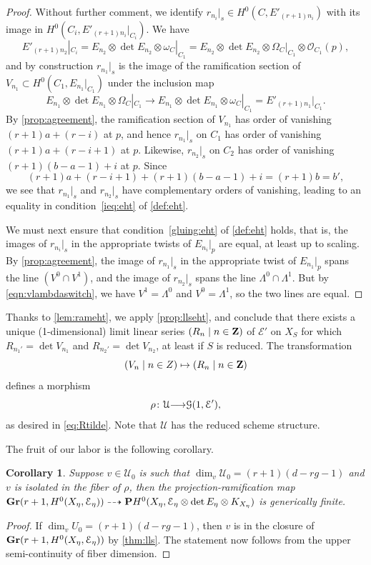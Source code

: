 \documentclass[11pt,reqno]{amsart}
\theoremstyle{plain}
\newtheorem{corollary}[theorem]{Corollary}
\theoremstyle{definition}
\theoremstyle{remark}
\numberwithin{equation}{section}
\renewcommand{\to}{{\longrightarrow}}
\numberwithin{equation}{section}
\renewcommand{\O}{\mathcal O}
\begin{document}
\begin{proof}
  Without further comment, we identify $r_{n_i}|_s \in H^0(C, E'_{(r+1)n_i})$ with its image in $H^0(C_i, E'_{(r+1)n_i}|_{C_i})$.
  We have
  \[E'_{(r+1)n_2}|_{C_i} = E_{n_2} \otimes \det E_{n_2} \otimes \omega_C|_{C_1} = E_{n_2} \otimes \det E_{n_2} \otimes \Omega_C|_{C_1} \otimes \O_{C_1}(p),\]
  and by construction $r_{n_1}|_s$ is the image of the ramification section of $V_{n_1} \subset H^0(C_1, E_{n_1}|_{C_1})$ under the inclusion map
  \[ E_{n_1} \otimes \det E_{n_1} \otimes \Omega_C|_{C_1} \to E_{n_1} \otimes \det E_{n_1} \otimes \omega_C|_{C_1} = E'_{(r+1)n_1}|_{C_1}.\]
  By \autoref{prop:agreement}, the ramification section of $V_{n_1}$ has order of vanishing $(r+1)a+(r-i)$ at $p$, and hence $r_{n_1}|_s$ on $C_1$ has order of vanishing $(r+1)a+(r-i+1)$ at $p$.
  Likewise, $r_{n_2}|_s$ on $C_2$ has order of vanishing $(r+1)(b-a-1)+i$ at $p$.
  Since
  \[ (r+1)a+(r-i+1) + (r+1)(b-a-1) + i = (r+1)b = b',\]
  we see that $r_{n_1}|_s$ and $r_{n_2}|_s$ have complementary orders of vanishing, leading to an equality in condition~\eqref{ieq:eht} of \autoref{def:eht}.

  We must next ensure that condition~\eqref{gluing:eht} of \autoref{def:eht} holds, that is, the images of $r_{n_i}|_s$ in the appropriate twists of $E_{n_i}|_p$ are equal, at least up to scaling.
  By \autoref{prop:agreement}, the image of $r_{n_1}|_s$ in the appropriate twist of $E_{n_1}|_p$ spans the line $(V^0 \cap V^1)$, and the image of $r_{n_2}|_s$ spans the line $\Lambda^0 \cap \Lambda^1$.
  But by \eqref{eqn:vlambdaswitch}, we have $V^1 = \Lambda^0$ and $V^0 = \Lambda^1$, so the two lines are equal.
\end{proof}

Thanks to \autoref{lem:rameht}, we apply \autoref{prop:llseht}, and conclude that there exists a unique (1-dimensional) limit linear series $(R_n \mid n \in {\bf Z})$ of $\mathcal E'$ on $X_S$ for which $R_{n_1'} = \det V_{n_1}$ and $R_{n_2'} = \det V_{n_2}$, at least if $S$ is reduced.
The transformation
\[ (V_n \mid n \in Z) \mapsto (R_n \mid n \in {\bf Z})\]
defines a morphism
\begin{equation}\label{prop:mapreduced}
  \rho \from \mathcal U \to \mathcal G(1, \mathcal E'),
\end{equation}
as desired in \eqref{eq:Rtilde}.
Note that $\mathcal U$ has the reduced scheme structure.

The fruit of our labor is the following corollary.
\begin{corollary}\label{prop:degeneration}
  Suppose $v \in \mathcal U_0$ is such that $\dim_v \mathcal U_0 = (r+1)(d-rg-1)$ and $v$ is isolated in the fiber of $\rho$, then the projection-ramification map ${\bf Gr}(r+1, H^0(X_\eta, \mathcal E_\eta)) \dashrightarrow {\bf P} H^0(X_\eta, \mathcal E_\eta \otimes \det E_\eta \otimes K_{X_\eta})$ is generically finite.
\end{corollary}
\begin{proof}
  If $\dim_v U_0 = (r+1)(d-rg-1)$, then $v$ is in the closure of ${\bf Gr}(r+1, H^0(X_\eta, \mathcal E_\eta))$ by \autoref{thm:lls}.
  The statement now follows from the upper semi-continuity of fiber dimension.
\end{proof}
\end{document}
